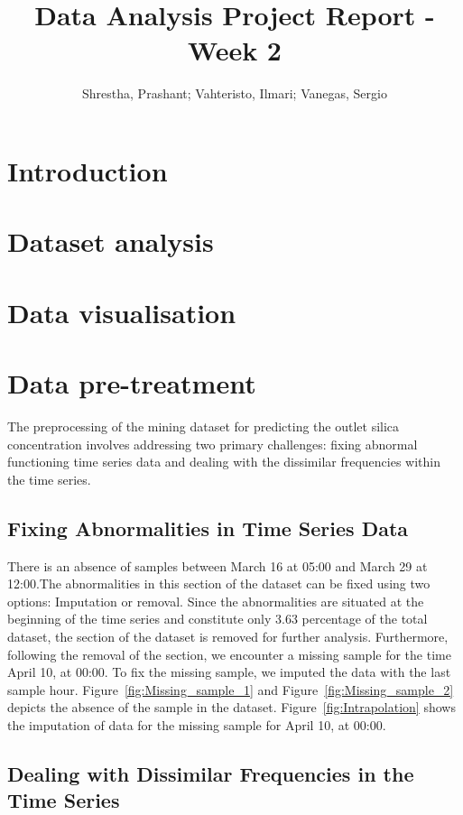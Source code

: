 \documentclass{article}
\title{Data Analysis Project Report - Week 2}
\author{Shrestha, Prashant; Vahteristo, Ilmari; Vanegas, Sergio}
\begin{document}
\maketitle

\section{Introduction} %

\section{Dataset analysis}

\section{Data visualisation}

\section{Data pre-treatment}
The preprocessing of the mining dataset for predicting the outlet silica concentration involves addressing two primary challenges: fixing abnormal functioning time series data and dealing with the dissimilar frequencies within the time series.

\subsection{Fixing Abnormalities in Time Series Data}

There is an absence of samples between March 16 at 05:00 and March 29 at 12:00.The abnormalities in this section of the dataset can be fixed using two options: Imputation or removal. Since the abnormalities are situated at the beginning of the time series and constitute only 3.63 percentage of the total dataset, the section of the dataset is removed for further analysis. Furthermore, following the removal of the section, we encounter a missing sample for the time April 10, at 00:00. To fix the missing sample, we imputed the data with the last sample hour. Figure~\ref{fig:Missing_sample_1} and Figure~\ref{fig:Missing_sample_2} depicts the absence of the sample in the dataset. Figure~\ref{fig:Intrapolation} shows the imputation of data for the missing sample for April 10, at 00:00.

\subsection{Dealing with Dissimilar Frequencies in the Time Series}
\end{document}

